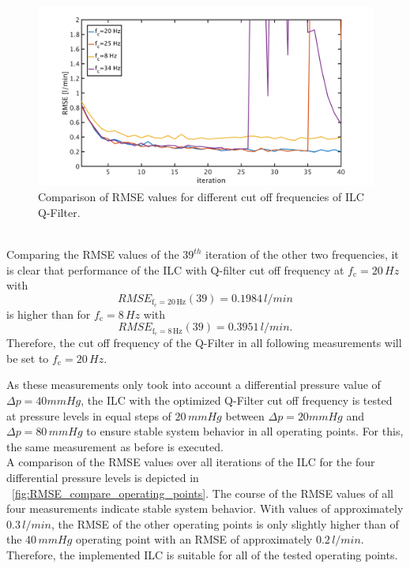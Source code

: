 \begin{figure}[ht]
  \centering
  \includegraphics[width=\textwidth]{images/chapt_5/ILC/RMSE_compare_ILC3_fc.pdf}
  \caption[Comparison of RMSE values for different cut off frequencies of ILC Q-Filter]{Comparison of RMSE values for different cut off frequencies of ILC Q-Filter.}
  \label{fig:RMSE_compare_ILC3_fc}
\end{figure}
\\Comparing the RMSE values of the $39^{th}$ iteration of the other two frequencies, it is clear that performance of the ILC with Q-filter cut off frequency at $f_{\mathrm{c}}=20\,Hz$ with
\begin{equation}
  RMSE_{\mathrm{f_{\mathrm{c}}=20\,Hz}}(39)=0.1984\,l/min
\end{equation}
is higher than for $f_{\mathrm{c}}=8\,Hz$ with
\begin{equation}
  RMSE_{\mathrm{f_{\mathrm{c}}=8\,Hz}}(39)=0.3951\,l/min.
\end{equation}
Therefore, the cut off frequency of the Q-Filter in all following measurements will be set to $f_{\mathrm{c}}=20\,Hz$.

As these measurements only took into account a differential pressure value of $\Delta{p}=40mmHg$, the ILC with the optimized Q-Filter cut off frequency is tested at pressure levels in equal steps of $20\,mmHg$ between $\Delta{p}=20mmHg$ and $\Delta{p}=80\,mmHg$ to ensure stable system behavior in all operating points. For this, the same measurement as before is executed.
\\A comparison of the RMSE values over all iterations of the ILC for the four differential pressure levels is depicted in \figurename~\ref{fig:RMSE_compare_operating_points}. The course of the RMSE values of all four measurements indicate stable system behavior. With values of approximately $0.3\, l/min$, the RMSE of the other operating points is only slightly higher than of the $40\,mmHg$ operating point with an RMSE of approximately $0.2\,l/min$. Therefore, the implemented ILC is suitable for all of the tested operating points.

